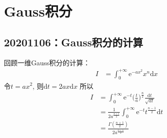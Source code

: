 \chapter{Gauss积分}
    \section{20201106：Gauss积分的计算}
        回顾一维Gauss积分的计算：
        \begin{align*}
            I &= \int_0^{+\infty} \mathrm{e}^{-ax^2} x^{n} \mathrm{d}x
        \end{align*}
        令$t = ax^2$, 则$\mathrm{d}t = 2ax\mathrm{d}x$
        所以
        \begin{align*}
        I &= \int_0^{+\infty} \mathrm{e}^{-t} \bigg(\frac ta\bigg)^{\frac n2} \frac {\mathrm{d}t}{\sqrt{at}}\\
        &= \frac 1{2a^{\frac {n+1}2}} \int_0^{+\infty} \mathrm{e}^{-t} t^{\frac {n-1}2} \mathrm{d}t\\
        &= \frac {\Gamma(\frac {n+1}2)}{2a^{\frac {n+1}2}}
        \end{align*}

